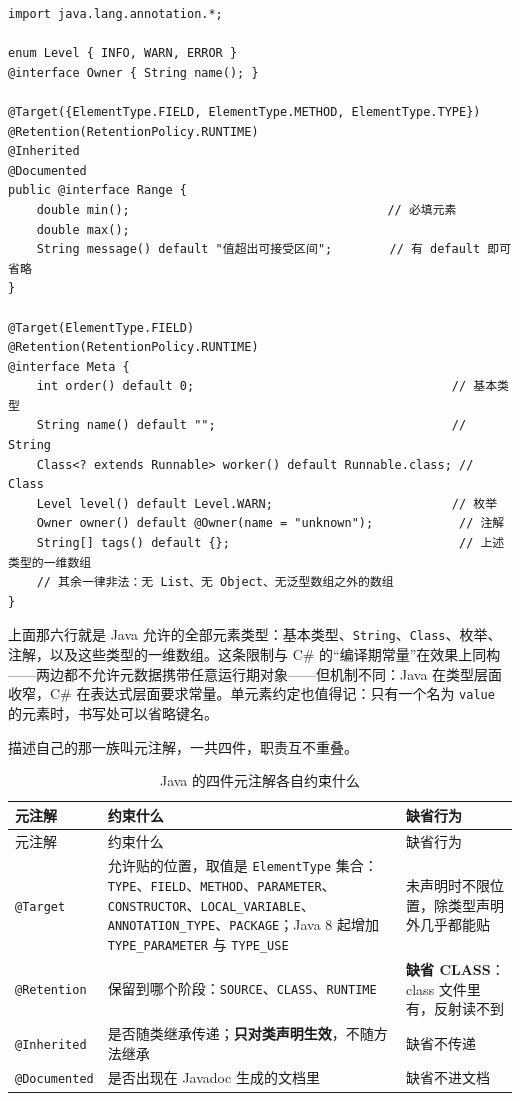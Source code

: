 \documentclass[12pt,a4paper,fontset=fandol]{ctexbook}
\newcommand{\javalabel}{%
  \tcbox[on line,colback=javaheadbg,colframe=javaheadbg,
    boxrule=0pt,arc=1pt,left=2pt,right=2pt,top=1pt,bottom=1pt,
    colupper=white,fontupper=\scriptsize\bfseries]{Java}}
\newcommand{\kw}[1]{\texttt{#1}}
\begin{document}
\javalabel
\begin{lstlisting}[style=javastyle,caption={Java 的注解声明：元素即抽象方法形态，合法元素类型只有这一小撮},label={lst:ch3-java-meta}]
import java.lang.annotation.*;

enum Level { INFO, WARN, ERROR }
@interface Owner { String name(); }

@Target({ElementType.FIELD, ElementType.METHOD, ElementType.TYPE})
@Retention(RetentionPolicy.RUNTIME)
@Inherited
@Documented
public @interface Range {
    double min();                                    // 必填元素
    double max();
    String message() default "值超出可接受区间";        // 有 default 即可省略
}

@Target(ElementType.FIELD)
@Retention(RetentionPolicy.RUNTIME)
@interface Meta {
    int order() default 0;                                    // 基本类型
    String name() default "";                                 // String
    Class<? extends Runnable> worker() default Runnable.class; // Class
    Level level() default Level.WARN;                         // 枚举
    Owner owner() default @Owner(name = "unknown");            // 注解
    String[] tags() default {};                                // 上述类型的一维数组
    // 其余一律非法：无 List、无 Object、无泛型数组之外的数组
}
\end{lstlisting}

上面那六行就是 Java 允许的全部元素类型：基本类型、\texttt{String}、\texttt{Class}、枚举、注解，以及这些类型的一维数组。这条限制与 C\# 的“编译期常量”在效果上同构——两边都不允许元数据携带任意运行期对象——但机制不同：Java 在类型层面收窄，C\# 在表达式层面要求常量。单元素约定也值得记：只有一个名为 \kw{value} 的元素时，书写处可以省略键名。

描述自己的那一族叫元注解，一共四件，职责互不重叠。

{\footnotesize
\begin{longtable}{@{}>{\raggedright\arraybackslash}p{}>{\raggedright\arraybackslash}p{}>{\raggedright\arraybackslash}p{}@{}}
\caption{Java 的四件元注解各自约束什么}\label{tab:ch3-java-metaannotations}\\
\toprule
元注解 & 约束什么 & 缺省行为 \\
\midrule
\endfirsthead
\toprule
元注解 & 约束什么 & 缺省行为 \\
\midrule
\endhead
\bottomrule
\endfoot
\texttt{@Target} & 允许贴的位置，取值是 \texttt{ElementType} 集合：\texttt{TYPE}、\texttt{FIELD}、\texttt{METHOD}、\texttt{PARAMETER}、\texttt{CONSTRUCTOR}、\texttt{LOCAL\_VARIABLE}、\texttt{ANNOTATION\_TYPE}、\texttt{PACKAGE}；Java 8 起增加 \texttt{TYPE\_PARAMETER} 与 \texttt{TYPE\_USE} & 未声明时不限位置，除类型声明外几乎都能贴 \\
\texttt{@Retention} & 保留到哪个阶段：\texttt{SOURCE}、\texttt{CLASS}、\texttt{RUNTIME} & \textbf{缺省 CLASS}：class 文件里有，反射读不到 \\
\texttt{@Inherited} & 是否随类继承传递；\textbf{只对类声明生效}，不随方法继承 & 缺省不传递 \\
\texttt{@Documented} & 是否出现在 Javadoc 生成的文档里 & 缺省不进文档 \\
\end{longtable}}
\end{document}
